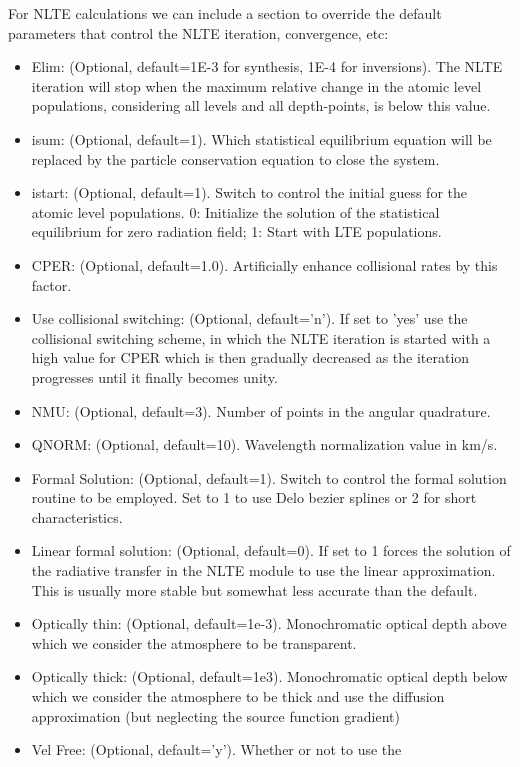 For NLTE calculations we can include a section to override the default
parameters that control the NLTE iteration, convergence, etc:
\begin{itemize}
\item Elim: (Optional, default=1E-3 for synthesis, 1E-4 for inversions). The
NLTE iteration will stop when the maximum relative change in the
atomic level populations, considering all levels and all depth-points,
is below this value.
\item isum: (Optional, default=1). Which statistical equilibrium
  equation will be replaced by the particle conservation equation to
  close the system.
\item istart: (Optional, default=1). Switch to control the initial
  guess for the atomic level populations. 0: Initialize the solution
  of the statistical equilibrium for zero radiation field; 1: Start
  with LTE populations.
\item CPER: (Optional, default=1.0). Artificially enhance collisional
  rates by this factor.
\item Use collisional switching: (Optional, default='n'). If set to
  'yes' use the collisional switching scheme, in which the NLTE
  iteration is started with a high value for CPER which is then
  gradually decreased as the iteration progresses until it finally
  becomes unity.
\item NMU: (Optional, default=3). Number of points in the angular quadrature.
\item QNORM: (Optional, default=10). Wavelength normalization value in km/s.
\item Formal Solution: (Optional, default=1). Switch to control the
  formal solution routine to be employed. Set to 1 to use Delo bezier
  splines or 2 for short characteristics.
\item Linear formal solution: (Optional, default=0). If set to 1
  forces the solution of the radiative transfer in the NLTE module to
  use the linear approximation. This is usually more stable but somewhat
  less accurate than the default.
\item Optically thin: (Optional, default=1e-3). Monochromatic optical
  depth above which we consider the atmosphere to be transparent.
\item Optically thick: (Optional, default=1e3). Monochromatic optical
  depth below which we consider the atmosphere to be thick and use the
  diffusion approximation (but neglecting the source function gradient)
\item Vel Free: (Optional, default='y'). Whether or not to use the

\end{itemize}

